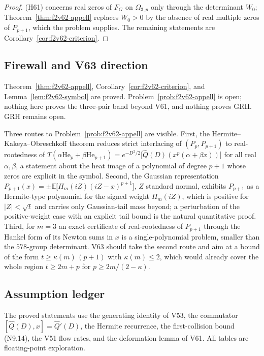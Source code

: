 \documentclass[11pt]{article}
\theoremstyle{definition}
\theoremstyle{remark}
\begin{document}
\begin{proof}
(H61) concerns real zeros of \(F_G\) on \(\Omega_{3,p}\) only through
the determinant \(W_0\); Theorem~\ref{thm:f2v62-appell} replaces
\(W_0>0\) by the absence of real multiple zeros of \(P_{p+1}\), which
the problem supplies.  The remaining statements are
Corollary~\ref{cor:f2v62-criterion}.
\end{proof}

\subsection*{Firewall and V63 direction}
\label{fire:f2v62}
Theorem~\ref{thm:f2v62-appell}, Corollary~\ref{cor:f2v62-criterion}, and
Lemma~\ref{lem:f2v62-symbol} are proved.  Problem~\ref{prob:f2v62-appell}
is open; nothing here proves the three-pair band beyond V61, and
nothing proves GRH.  GRH remains open.

Three routes to Problem~\ref{prob:f2v62-appell} are visible.  First, the
Hermite--Kakeya--Obreschkoff theorem reduces strict interlacing of
\((P_p,P_{p+1})\) to real-rootedness of
\(T(\alpha\mathrm{He}_p+\beta\mathrm{He}_{p+1})=e^{-D^2/2}\bigl[\widehat Q(D)(x^p(\alpha+\beta x))\bigr]\)
for all real \(\alpha,\beta\), a statement about the heat image of a
polynomial of degree \(p+1\) whose zeros are explicit in the symbol.
Second, the Gaussian representation
\(P_{p+1}(x)=\pm\mathbb E\bigl[\Pi_m(iZ)(iZ-x)^{p+1}\bigr]\), \(Z\)
standard normal, exhibits \(P_{p+1}\) as a Hermite-type polynomial for
the signed weight \(\Pi_m(iZ)\), which is positive for \(|Z|<\sqrt t\)
and carries only Gaussian-tail mass beyond; a perturbation of the
positive-weight case with an explicit tail bound is the natural
quantitative proof.  Third, for \(m=3\) an exact certificate of
real-rootedness of \(P_{p+1}\) through the Hankel form of its Newton
sums in \(x\) is a single-polynomial problem, smaller than the
\(578\)-group determinant.  V63 should take the second route and aim at
a bound of the form \(t\ge\kappa(m)\,(p+1)\) with \(\kappa(m)\le2\),
which would already cover the whole region \(t\ge2m+p\) for
\(p\ge2m/(2-\kappa)\).

\subsection*{Assumption ledger}
\label{ass:f2v62}
The proved statements use the generating identity of V53, the
commutator \([\widehat Q(D),x]=\widehat Q'(D)\), the Hermite recurrence,
the first-collision bound \textup{(N9.14)}, the V51 flow rates, and the
deformation lemma of V61.  All tables are floating-point exploration.
\endgroup
\end{document}
